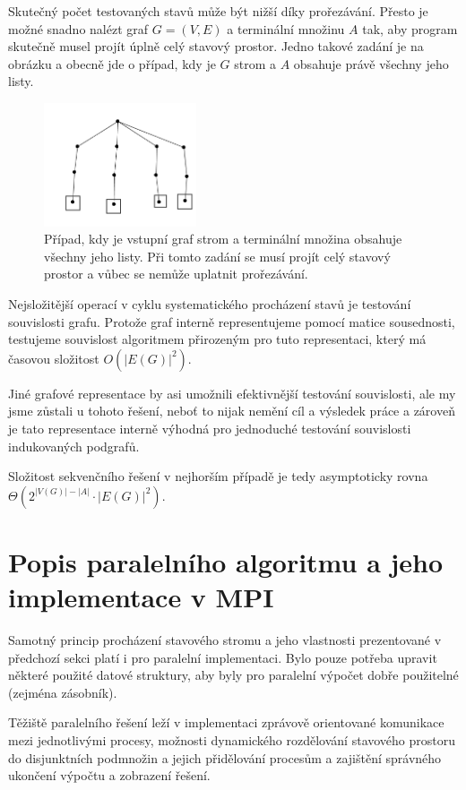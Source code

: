 \documentclass[12pt]{article}
\theoremstyle{definition}
\begin{document}
Skutečný počet testovaných stavů může být nižší díky prořezávání. Přesto je možné snadno nalézt graf $G=(V,E)$ a terminální množinu $A$ tak, aby program skutečně musel projít úplně celý stavový prostor. Jedno takové zadání je na obrázku a obecně jde o případ, kdy je
$G$ strom a $A$ obsahuje právě všechny jeho listy.
\begin{figure}[ht]
	\centering
	\includegraphics[width=0.4\textwidth]{obr/worst.png}
	\caption{Případ, kdy je vstupní graf strom a terminální množina obsahuje všechny jeho listy. Při tomto zadání se musí
		projít celý stavový prostor a vůbec se nemůže uplatnit prořezávání.}
	\label{imgWorst}
\end{figure}

Nejsložitější operací v cyklu systematického procházení stavů je testování souvislosti
grafu. Protože graf interně representujeme pomocí matice sousednosti, testujeme souvislost algoritmem přirozeným pro tuto representaci, který má časovou složitost $O(|E(G)|^2)$.

Jiné grafové representace by asi umožnili efektivnější testování souvislosti, ale my jsme zůstali u tohoto řešení, neboť to nijak nemění cíl a výsledek práce a zároveň je tato representace interně výhodná pro jednoduché testování souvislosti indukovaných podgrafů.

Složitost sekvenčního řešení v nejhorším případě je tedy asymptoticky rovna $\Theta(2^{|V(G)|-|A|}\cdot |E(G)|^2)$.




\section{Popis paralelního algoritmu a jeho implementace v MPI}
Samotný princip procházení stavového stromu a jeho vlastnosti prezentované v předchozí sekci
platí i pro paralelní implementaci. Bylo pouze potřeba upravit některé použité datové struktury, aby
byly pro paralelní výpočet dobře použitelné (zejména zásobník).

Těžiště paralelního řešení leží v implementaci zprávově orientované komunikace mezi
jednotlivými procesy, možnosti dynamického rozdělování stavového prostoru do disjunktních podmnožin a jejich
přidělování procesům a zajištění správného ukončení výpočtu a zobrazení řešení.
\end{document}
